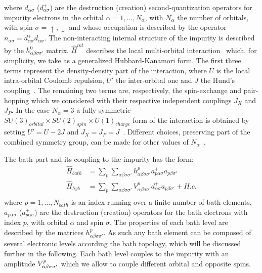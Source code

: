 \documentclass[preprint,3p,10pt]{elsarticle}
\def\a{\alpha}       \def\b{\beta}   \def\g{\gamma}   \def\d{\delta}
\def\up{\uparrow} \def\down{\downarrow} \def\dw{\downarrow}
\begin{document}
where $d_{\a\sigma}$ ($d^+_{\a\sigma}$) are the destruction (creation)
second-quantization operators for impurity electrons in the
orbital $\alpha=1,\dots,N_\a$, with $N_\a$ the number of orbitals,
with spin $\sigma=\up,\dw$ and whose occupation is described
by the  operator  
$n_{\alpha\sigma}=d^{+}_{\alpha\sigma}d_{\alpha\sigma}$. 
The non-interacting internal structure of the impurity is described by
the $h^{0}_{\a\b\sigma\sigma'}$ matrix. 
$\hat{H}^{int}$ describes the  local multi-orbital
interaction~\cite{Georges2013ACMP} which, for simplicity, we take as a
generalized Hubbard-Kanamori form.  
The first three terms represent the density-density part of the
interaction, where $U$ is the local intra-orbital Coulomb repulsion,
$U'$ the inter-orbital one and $J$ the Hund's coupling~\cite{Georges2013ACMP}.  
The  remaining two terms are, respectively, the spin-exchange and
pair-hopping which we considered with their respective independent
couplings $J_X$ and $J_P$.
In the case $N_\a=3$ a fully symmetric $SU(3)_{orbital}\times SU(2)_{spin}\times
U(1)_{charge}$ form of the interaction is obtained by setting $U'=U-2J$ and
$J_X=J_P=J$~\cite{Georges2013ACMP}. Different choices, preserving part
of the combined symmetry group, can be made for other values of
$N_\a$~\cite{Georges2013ACMP}. 


The bath part and its coupling to the impurity has the form: 
\begin{equation}\label{Hbath}
  \begin{split}
    \hat{H}_{bath} &=
    \sum_p\sum_{\a\b\sigma\sigma'}h^p_{\a\b\sigma\sigma'}a^{+}_{p\a\sigma}a_{p\b\sigma'}\\
    \hat{H}_{hyb} &= \sum_p\sum_{\a\b\sigma\sigma'}V^p_{\a\b\sigma\sigma'}d^{+}_{\a\sigma}a_{p\b\sigma'}+H.c. \\
\end{split}
\end{equation}
where $p=1,\dots,N_{bath}$ is an index running over a finite number of
bath elements, $a_{p\alpha\sigma}$ ($a^+_{p\alpha\sigma}$) are the destruction (creation) operators for
the bath electrons with index $p$, with orbital $\alpha$ and
spin $\sigma$.
The  properties of each bath level are described by the
matrices $h^p_{\a\b\sigma\sigma'}$. As such any bath element can be
composed of several electronic levels according the bath topology,
which will be discussed further in the following.
Each bath level couples to the impurity with an amplitude
$V^p_{\a\b\s\sigma'}$ which we allow to couple different orbital and
opposite spins.   
\end{document}
